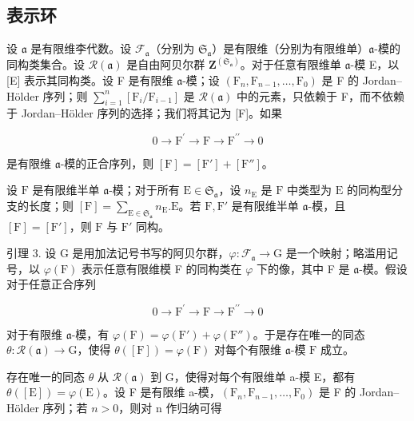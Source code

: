 \subsection{表示环}

设 \(\mathfrak{a}\) 是有限维李代数。设 \(\mathcal{F}_{\mathfrak{a}}\)（分别为 \(\mathfrak{S}_{\mathfrak{a}}\)）是有限维（分别为有限维单）\(\mathfrak{a}\)-模的同构类集合。设 \(\mathcal{R}(\mathfrak{a})\) 是自由阿贝尔群 \(\mathbf{Z}^{(\mathfrak{S}_{\mathfrak{a}})}\)。对于任意有限维单 \(\mathfrak{a}\)-模 E，以 {[}E{]} 表示其同构类。设 F 是有限维 \(\mathfrak{a}\)-模；设 \((\mathrm{F}_n,\mathrm{F}_{n - 1},\dots ,\mathrm{F}_0)\) 是 F 的 Jordan–Hölder 序列；则 \(\sum_{i = 1}^{n}[\mathrm{F}_i / \mathrm{F}_{i - 1}]\) 是 \(\mathcal{R}(\mathfrak{a})\) 中的元素，只依赖于 F，而不依赖于 Jordan–Hölder 序列的选择；我们将其记为 {[}F{]}。如果

\[
0 \longrightarrow \mathrm{F} ^ {\prime} \longrightarrow \mathrm{F} \longrightarrow \mathrm{F} ^ {\prime \prime} \longrightarrow 0
\]

是有限维 \(\mathfrak{a}\)-模的正合序列，则 \([\mathrm{F}] = [\mathrm{F}'] + [\mathrm{F}'']\)。

设 \(\mathrm{F}\) 是有限维半单 \(\mathfrak{a}\)-模；对于所有 \(\mathrm{E} \in \mathfrak{S}_{\mathfrak{a}}\)，设 \(n_{\mathrm{E}}\) 是 \(\mathrm{F}\) 中类型为 \(\mathrm{E}\) 的同构型分支的长度；则 \([\mathrm{F}] = \sum_{\mathrm{E} \in \mathfrak{S}_{\mathfrak{a}}} n_{\mathrm{E}}. \mathrm{E}\)。若 \(\mathrm{F}, \mathrm{F}'\) 是有限维半单 \(\mathfrak{a}\)-模，且 \([\mathrm{F}] = [\mathrm{F}']\)，则 \(\mathrm{F}\) 与 \(\mathrm{F}'\) 同构。

引理 3. 设 G 是用加法记号书写的阿贝尔群，\(\varphi : \mathcal{F}_{\mathfrak{a}} \to \mathrm{G}\) 是一个映射；略滥用记号，以 \(\varphi(\mathrm{F})\) 表示任意有限维模 F 的同构类在 \(\varphi\) 下的像，其中 F 是 \(\mathfrak{a}\)-模。假设对于任意正合序列

\[
0 \longrightarrow \mathrm{F} ^ {\prime} \longrightarrow \mathrm{F} \longrightarrow \mathrm{F} ^ {\prime \prime} \longrightarrow 0
\]

对于有限维 \(\mathfrak{a}\)-模，有 \(\varphi(\mathrm{F}) = \varphi(\mathrm{F}') + \varphi(\mathrm{F}'')\)。于是存在唯一的同态 \(\theta: \mathcal{R}(\mathfrak{a}) \to \mathrm{G}\)，使得 \(\theta([\mathrm{F}]) = \varphi(\mathrm{F})\) 对每个有限维 \(\mathfrak{a}\)-模 \(\mathrm{F}\) 成立。

存在唯一的同态 \(\theta\) 从 \(\mathcal{R}(\mathfrak{a})\) 到 G，使得对每个有限维单 a-模 E，都有 \(\theta([\mathrm{E}]) = \varphi(\mathrm{E})\)。设 F 是有限维 a-模，\((\mathrm{F}_{n}, \mathrm{F}_{n-1}, \ldots, \mathrm{F}_{0})\) 是 F 的 Jordan–Hölder 序列；若 \(n > 0\)，则对 n 作归纳可得

